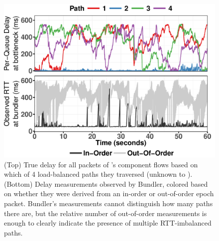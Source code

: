 

\begin{figure}
    \centering
\includegraphics[width=\maxwidth]{figure/ecmp_delay.pdf} 
\vspace{2pt}
\caption{(Top) True delay for all packets of \name's component flows based on which of 4 load-balanced paths they traversed (unknown to \name). (Bottom) Delay measurements observed by Bundler, colored based on whether they were derived from an in-order or out-of-order epoch packet. Bundler's measurements cannot distinguish how many paths there are, but the relative number of out-of-order measurements is enough to clearly indicate the presence of multiple RTT-imbalanced paths.}
\label{fig:queue-ctl:ecmp:motivation}
\end{figure}
